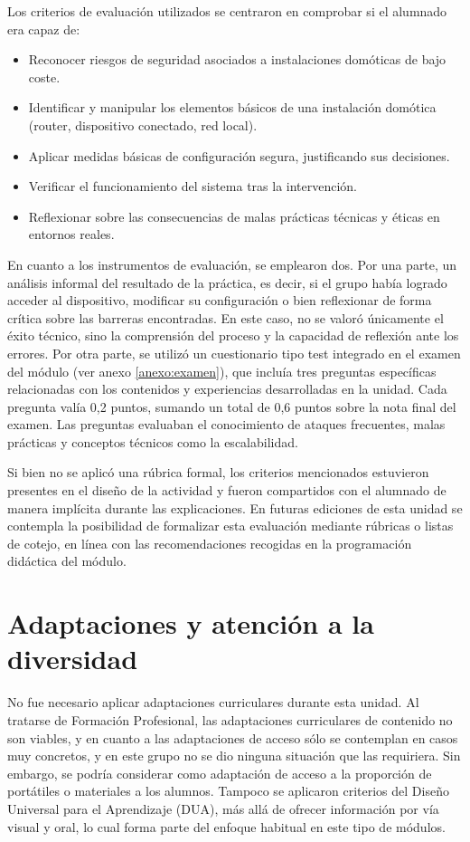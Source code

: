 Los criterios de evaluación utilizados se centraron en comprobar si el alumnado era capaz de:

\begin{itemize}
  \item Reconocer riesgos de seguridad asociados a instalaciones domóticas de bajo coste.
  \item Identificar y manipular los elementos básicos de una instalación domótica (router, dispositivo conectado, red local).
  \item Aplicar medidas básicas de configuración segura, justificando sus decisiones.
  \item Verificar el funcionamiento del sistema tras la intervención.
  \item Reflexionar sobre las consecuencias de malas prácticas técnicas y éticas en entornos reales.
\end{itemize}

En cuanto a los instrumentos de evaluación, se emplearon dos. Por una parte, un análisis informal del resultado de la práctica, es decir, si el grupo había logrado acceder al dispositivo, modificar su configuración o bien reflexionar de forma crítica sobre las barreras encontradas. En este caso, no se valoró únicamente el éxito técnico, sino la comprensión del proceso y la capacidad de reflexión ante los errores. Por otra parte, se utilizó un cuestionario tipo test integrado en el examen del módulo (ver anexo \ref{anexo:examen}), que incluía tres preguntas específicas relacionadas con los contenidos y experiencias desarrolladas en la unidad. Cada pregunta valía 0,2 puntos, sumando un total de 0,6 puntos sobre la nota final del examen. Las preguntas evaluaban el conocimiento de ataques frecuentes, malas prácticas y conceptos técnicos como la escalabilidad.

Si bien no se aplicó una rúbrica formal, los criterios mencionados estuvieron presentes en el diseño de la actividad y fueron compartidos con el alumnado de manera implícita durante las explicaciones. En futuras ediciones de esta unidad se contempla la posibilidad de formalizar esta evaluación mediante rúbricas o listas de cotejo, en línea con las recomendaciones recogidas en la programación didáctica del módulo.


\section{Adaptaciones y atención a la diversidad}

No fue necesario aplicar adaptaciones curriculares durante esta unidad. Al tratarse de Formación Profesional, las adaptaciones curriculares de contenido no son viables, y en cuanto a las adaptaciones de acceso sólo se contemplan en casos muy concretos, y en este grupo no se dio ninguna situación que las requiriera. Sin embargo, se podría considerar como adaptación de acceso a la proporción de portátiles o materiales a los alumnos.
Tampoco se aplicaron criterios del Diseño Universal para el Aprendizaje (DUA), más allá de ofrecer información por vía visual y oral, lo cual forma parte del enfoque habitual en este tipo de módulos.
